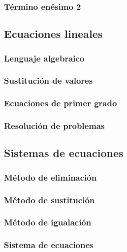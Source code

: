 \documentclass[12pt,addpoints]{evalua3}
\begin{document}
\begin{questions}
	\subsubsection{Término enésimo 2}
	\question{}
	\subsection   {Ecuaciones lineales}
	\subsubsection{Lenguaje algebraico}
	\question{}
	\subsubsection{Sustitución de valores}
	\question{}
	\subsubsection{Ecuaciones de primer grado}
	\question{}
	\subsubsection{Resolución de problemas}
	\question{}
	\subsection   {Sistemas de ecuaciones}
	\subsubsection{Método de eliminación}
	\question{}
	\subsubsection{Método de sustitución}
	\question{}
	\subsubsection{Método de igualación}
	\question{}
	\subsubsection{Sistema de ecuaciones}
	\question{}
\end{questions}
\end{document}
